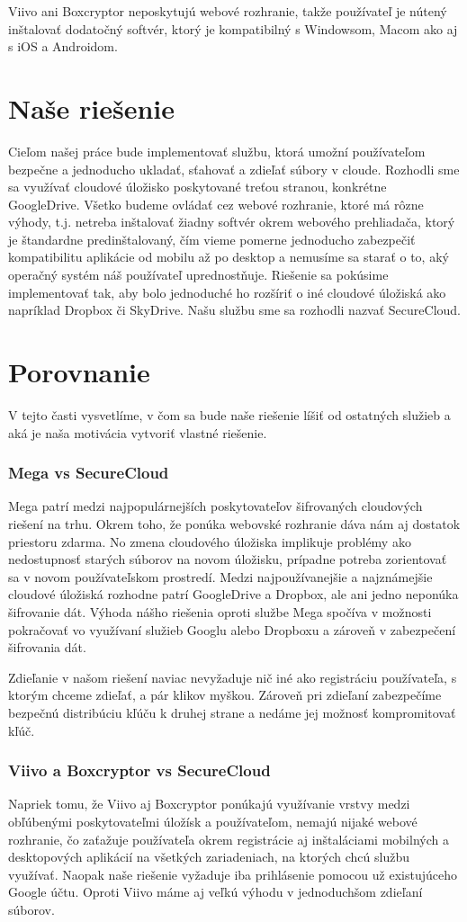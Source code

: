 		Viivo ani Boxcryptor neposkytujú webové rozhranie, takže používateľ je nútený inštalovať dodatočný softvér, ktorý je kompatibilný s Windowsom, Macom ako aj s iOS a Androidom.

\section{Naše riešenie}
	Cieľom našej práce bude implementovať službu, ktorá umožní používateľom bezpečne a jednoducho ukladať, sťahovať a zdieľať súbory v cloude. Rozhodli sme sa využívať cloudové úložisko poskytované treťou stranou, konkrétne GoogleDrive. Všetko budeme ovládať cez webové rozhranie, ktoré má rôzne výhody, t.j. netreba inštalovať žiadny softvér okrem webového prehliadača, ktorý je štandardne predinštalovaný, čím vieme pomerne jednoducho zabezpečiť kompatibilitu aplikácie od mobilu až po desktop a nemusíme sa starať o to, aký operačný systém náš používateľ uprednostňuje. Riešenie sa pokúsime implementovať tak, aby bolo jednoduché ho rozšíriť o iné cloudové úložiská ako napríklad Dropbox či SkyDrive. Našu službu sme sa rozhodli nazvať SecureCloud.

\section{Porovnanie}
	V tejto časti vysvetlíme, v čom sa bude naše riešenie líšiť od ostatných služieb a aká je naša motivácia vytvoriť vlastné riešenie.
	\subsubsection{Mega vs SecureCloud}
	Mega patrí medzi najpopulárnejších poskytovateľov šifrovaných cloudových riešení na trhu. Okrem toho, že ponúka webovské rozhranie dáva nám aj dostatok priestoru zdarma. No zmena cloudového úložiska implikuje problémy ako nedostupnosť starých súborov na novom úložisku, prípadne potreba zorientovať sa v novom používateľskom prostredí. Medzi najpoužívanejšie a najznámejšie cloudové úložiská rozhodne patrí GoogleDrive a Dropbox, ale ani jedno neponúka šifrovanie dát. Výhoda nášho riešenia oproti službe Mega spočíva v možnosti pokračovať vo využívaní služieb Googlu alebo Dropboxu a zároveň v zabezpečení šifrovania dát. 
	
	Zdieľanie v našom riešení naviac nevyžaduje nič iné ako registráciu používateľa, s ktorým chceme zdieľať, a pár klikov myškou. Zároveň pri zdieľaní zabezpečíme bezpečnú distribúciu kľúču k druhej strane a nedáme jej možnosť kompromitovať kľúč.
	
	\subsubsection{Viivo a Boxcryptor vs SecureCloud}
	Napriek tomu, že Viivo aj Boxcryptor ponúkajú využívanie vrstvy medzi obľúbenými poskytovateľmi úložísk a používateľom, nemajú nijaké webové rozhranie, čo zaťažuje používateľa okrem registrácie aj inštaláciami mobilných a desktopových aplikácií na všetkých zariadeniach, na ktorých chcú službu využívať. Naopak naše riešenie vyžaduje iba prihlásenie pomocou už existujúceho Google účtu. Oproti Viivo máme aj veľkú výhodu v jednoduchšom zdieľaní súborov.
	
	
